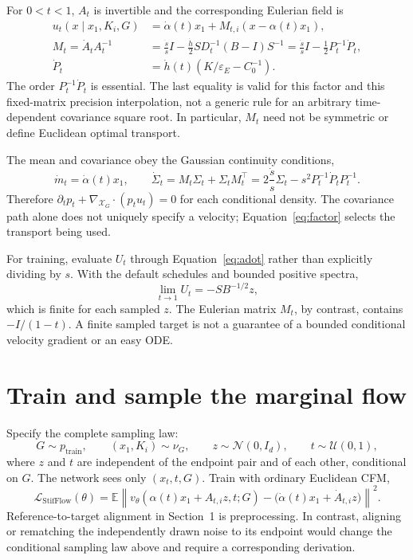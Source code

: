 \documentclass[11pt,letterpaper]{article}
\newcommand{\E}{\mathbb E}
\newcommand{\X}{\mathcal X_G}
\newcommand{\epsE}{\varepsilon_E}
\begin{document}
For $0<t<1$, $A_t$ is invertible and the corresponding Eulerian field is
\begin{equation}\label{eq:u}
\boxed{\begin{aligned}
u_t(x\mid x_1,K_i,G)&=\dot\alpha(t)x_1+M_{t,i}(x-\alpha(t)x_1),\\
M_t=\dot A_tA_t^{-1}
&=\frac{\dot s}{s}I-\frac{\dot h}{2}SD_t^{-1}(B-I)S^{-1}
=\frac{\dot s}{s}I-\frac12P_t^{-1}\dot P_t,\\
\dot P_t&=\dot h(t)(K/\epsE-C_0^{-1}).
\end{aligned}}
\end{equation}
The order $P_t^{-1}\dot P_t$ is essential. The last equality is valid for this factor and this fixed-matrix precision interpolation, not a generic rule for an arbitrary time-dependent covariance square root. In particular, $M_t$ need not be symmetric or define Euclidean optimal transport.

The mean and covariance obey the Gaussian continuity conditions,
\begin{equation}\label{eq:covcontinuity}
\dot m_t=\dot\alpha(t)x_1,\qquad
\dot\Sigma_t=M_t\Sigma_t+\Sigma_tM_t^\top
=2\frac{\dot s}{s}\Sigma_t-s^2P_t^{-1}\dot P_tP_t^{-1}.
\end{equation}
Therefore $\partial_t p_t+\nabla_{\X}\!\cdot(p_tu_t)=0$ for each conditional density. The covariance path alone does not uniquely specify a velocity; Equation~\eqref{eq:factor} selects the transport being used.

For training, evaluate $U_t$ through Equation~\eqref{eq:adot} rather than explicitly dividing by $s$. With the default schedules and bounded positive spectra,
\begin{equation}\label{eq:uterminal}
\lim_{t\to1}U_t=-SB^{-1/2}z,
\end{equation}
which is finite for each sampled $z$. The Eulerian matrix $M_t$, by contrast, contains $-I/(1-t)$. A finite sampled target is not a guarantee of a bounded conditional velocity gradient or an easy ODE.

\section{Train and sample the marginal flow}\label{sec:train}

Specify the complete sampling law:
\begin{equation}\label{eq:samplinglaw}
G\sim p_{\mathrm{train}},\qquad (x_1,K_i)\sim\nu_G,\qquad
z\sim\mathcal N(0,I_d),\qquad t\sim\mathcal U(0,1),
\end{equation}
where $z$ and $t$ are independent of the endpoint pair and of each other, conditional on $G$. The network sees only $(x_t,t,G)$. Train with ordinary Euclidean CFM,
\begin{equation}\label{eq:loss}
\boxed{\ \mathcal L_{\mathrm{StifFlow}}(\theta)=
\E\left\|v_\theta(\alpha(t)x_1+A_{t,i}z,t;G)
-\big(\dot\alpha(t)x_1+\dot A_{t,i}z\big)\right\|^2.\ }
\end{equation}
Reference-to-target alignment in Section~1 is preprocessing. In contrast, aligning or rematching the independently drawn noise to its endpoint would change the conditional sampling law above and require a corresponding derivation.
\end{document}
